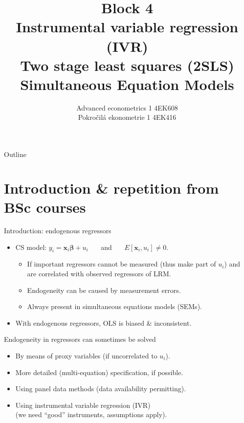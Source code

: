 \documentclass[usenames,dvipsnames]{beamer}
\title[Block 4]{Block 4\\ Instrumental variable regression (IVR)\\ Two stage least squares (2SLS)\\Simultaneous Equation Models}
\author{Advanced econometrics 1 4EK608 \\Pokročilá ekonometrie 1 4EK416}
\institute{Vysoká škola ekonomická v Praze}
\date{}
\begin{document}
 
\begin{frame}
  \titlepage
\end{frame}

\begin{frame}{Outline}
  \tableofcontents
\end{frame}

\section{Introduction \& repetition from BSc courses}
\begin{frame}{Introduction: endogenous regressors}
\begin{itemize}
\item  CS model: $y_i= \bm{x}_i\bm{\beta}+u_i$ ~~~and~~~ $E[\bm{x}_i, u_i] \neq 0$.
\begin{itemize}
\item If important regressors cannot be measured (thus make part of $u_i$)
and are correlated with observed regressors of LRM.
\item Endogeneity can be caused by measurement errors.
\item Always present in simultaneous equations models (SEMs).
\end{itemize}
\item With endogenous regressors, OLS is biased \& inconsistent.
\end{itemize}
\medskip
Endogeneity in regressors can sometimes be solved
\begin{itemize}
\item By means of proxy variables (if uncorrelated to $u_i$).
\item More detailed (multi-equation) specification, if possible.
\item Using panel data methods (data availability permitting).
\item Using instrumental variable regression (IVR) \\(we need ``good'' instruments, assumptions apply).
\end{itemize}
\end{frame}
\end{document}
